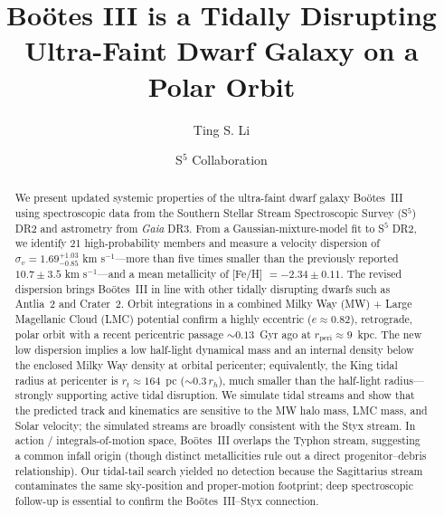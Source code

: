 \documentclass[twocolumn, apj, numberedappendix, appendixfloats]{openjournal_dhayaa}
\newcommand{\gaia}{\textit{Gaia}\xspace}
\begin{document}
\title{Boötes III is a Tidally Disrupting Ultra-Faint Dwarf Galaxy on a Polar Orbit}


\author{Ting S. Li }

\author{S$^5$ Collaboration}
\begin{abstract}
We present updated systemic properties of the ultra-faint dwarf galaxy Boötes~III using spectroscopic data from the Southern Stellar Stream Spectroscopic Survey (S$^5$) DR2 and astrometry from \gaia DR3.
From a Gaussian-mixture-model fit to S$^5$ DR2, we identify 21 high-probability members and measure a velocity dispersion of $\sigma_{v} = 1.69^{+1.03}_{-0.85}$ km s$^{-1}$---more than five times smaller than the previously reported $10.7 \pm 3.5$ km s$^{-1}$---and a mean metallicity of [Fe/H] $= -2.34 \pm 0.11$. The revised dispersion brings Boötes~III in line with other tidally disrupting dwarfs such as Antlia~2 and Crater~2.
Orbit integrations in a combined Milky Way (MW) + Large Magellanic Cloud (LMC) potential confirm a highly eccentric ($e \approx 0.82$), retrograde, polar orbit with a recent pericentric passage $\sim 0.13$~Gyr ago at $r_{\mathrm{peri}} \approx 9$~kpc. The new low dispersion implies a low half-light dynamical mass and an internal density below the enclosed Milky Way density at orbital pericenter; equivalently, the King tidal radius at pericenter is $r_t \approx 164$~pc ($\sim 0.3\,r_h$), much smaller than the half-light radius---strongly supporting active tidal disruption.
We simulate tidal streams and show that the predicted track and kinematics are sensitive to the MW halo mass, LMC mass, and Solar velocity; the simulated streams are broadly consistent with the Styx stream.
In action / integrals-of-motion space, Boötes~III overlaps the Typhon stream, suggesting a common infall origin (though distinct metallicities rule out a direct progenitor--debris relationship).
Our tidal-tail search yielded no detection because the Sagittarius stream contaminates the same sky-position and proper-motion footprint; deep spectroscopic follow-up is essential to confirm the Boötes~III--Styx connection.
\end{abstract}
\end{document}
